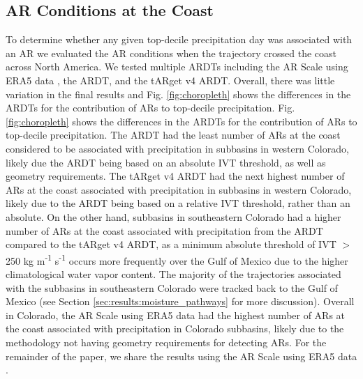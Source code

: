 \documentclass[draft]{agujournal2019}
\begin{document}
\subsection{AR Conditions at the Coast}
\label{sec:methods:ar_conditions}
To determine whether any given top-decile precipitation day was associated with an AR we evaluated the AR conditions when the trajectory crossed the coast across North America. We tested multiple ARDTs including the AR Scale using ERA5 data \cite{MartinRalph2019}, the  ARDT, and the \cite{Guan2024AERA5} tARget v4 ARDT. Overall, there was little variation in the final results and Fig. \ref{fig:choropleth} shows the differences in the ARDTs for the contribution of ARs to top-decile precipitation. Fig. \ref{fig:choropleth} shows the differences in the ARDTs for the contribution of ARs to top-decile precipitation. The  ARDT had the least number of ARs at the coast considered to be associated with precipitation in subbasins in western Colorado, likely due the ARDT being based on an absolute IVT threshold, as well as geometry requirements. The \cite{Guan2024AERA5} tARget v4 ARDT had the next highest number of ARs at the coast associated with precipitation in subbasins in western Colorado, likely due to the ARDT being based on a relative IVT threshold, rather than an absolute. On the other hand, subbasins in southeastern Colorado had a higher number of ARs at the coast associated with precipitation from the  ARDT compared to the \cite{Guan2024AERA5} tARget v4 ARDT, as a minimum absolute threshold of IVT $>$ 250 kg m\textsuperscript{-1} s\textsuperscript{-1} occurs more frequently over the Gulf of Mexico due to the higher climatological water vapor content. The majority of the trajectories associated with the subbasins in southeastern Colorado were tracked back to the Gulf of Mexico (see Section \ref{sec:results:moisture_pathways} for more discussion). Overall in Colorado, the AR Scale using ERA5 data \cite{MartinRalph2019} had the highest number of ARs at the coast associated with precipitation in Colorado subbasins, likely due to the methodology not having geometry requirements for detecting ARs. For the remainder of the paper, we share the results using the AR Scale using ERA5 data \cite{MartinRalph2019}.
\end{document}
